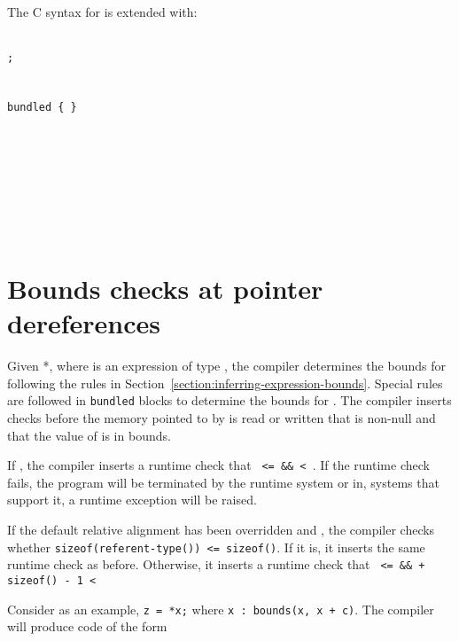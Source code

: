 The C syntax for is extended with:
\begin{tabbing}
\=\\
\>\texttt{;} \\
\\
 \\
\>\texttt{bundled \{  \}} \\
\\
\\
\>  \\
\>  \\
\\
\\
\> \\
\>  
\end{tabbing}

\section{Bounds checks at pointer dereferences}
\label{section:bounds-checking-indirections}

Given *, where  is an expression of type
\arrayptr, the compiler determines the bounds for 
following the rules in Section~\ref{section:inferring-expression-bounds}.
Special rules are followed in
\texttt{bundled} blocks to determine the bounds for . The
compiler inserts checks before the memory pointed to by  is
read or written that  is non-null and that the value of
 is in bounds.

If ,
the compiler inserts a runtime check that \texttt{ <=  \&\&
 < }. If the runtime check fails, the program
will be terminated by the runtime system or in, systems that support it,
a runtime exception will be raised.

If the default relative alignment has been overridden and
, the compiler checks whether
\texttt{sizeof(referent-type()) <= sizeof()}. If it is, it inserts the same
runtime check as before. Otherwise, it inserts a runtime check that
\texttt{ <=  \&\&  + sizeof() - 1 < }

Consider as an example, \verb|z = *x;| where 
\verb|x : bounds(x, x + c)|. The compiler will produce code of the form

